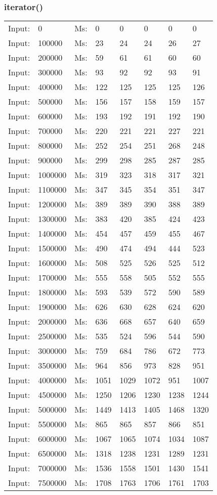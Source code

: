 \documentclass[11pt,a4paper]{report}
\begin{document}
\begin{tiny}
\subsubsection*{iterator()}
\begin{tabular}{l l ||l  l  l  l  l  l}
Input:&0&Ms:&0&0&0&0&0\\
Input:&100000&Ms:&23&24&24&26&27\\
Input:&200000&Ms:&59&61&61&60&60\\
Input:&300000&Ms:&93&92&92&93&91\\
Input:&400000&Ms:&122&125&125&125&126\\
Input:&500000&Ms:&156&157&158&159&157\\
Input:&600000&Ms:&193&192&191&192&190\\
Input:&700000&Ms:&220&221&221&227&221\\
Input:&800000&Ms:&252&254&251&268&248\\
Input:&900000&Ms:&299&298&285&287&285\\
Input:&1000000&Ms:&319&323&318&317&321\\
Input:&1100000&Ms:&347&345&354&351&347\\
Input:&1200000&Ms:&389&389&390&388&389\\
Input:&1300000&Ms:&383&420&385&424&423\\
Input:&1400000&Ms:&454&457&459&455&467\\
Input:&1500000&Ms:&490&474&494&444&523\\
Input:&1600000&Ms:&508&525&526&525&512\\
Input:&1700000&Ms:&555&558&505&552&555\\
Input:&1800000&Ms:&593&539&572&590&589\\
Input:&1900000&Ms:&626&630&628&624&620\\
Input:&2000000&Ms:&636&668&657&640&659\\
Input:&2500000&Ms:&535&524&596&544&590\\
Input:&3000000&Ms:&759&684&786&672&773\\
Input:&3500000&Ms:&964&856&973&828&951\\
Input:&4000000&Ms:&1051&1029&1072&951&1007\\
Input:&4500000&Ms:&1250&1206&1230&1238&1244\\
Input:&5000000&Ms:&1449&1413&1405&1468&1320\\
Input:&5500000&Ms:&865&865&857&866&851\\
Input:&6000000&Ms:&1067&1065&1074&1034&1087\\
Input:&6500000&Ms:&1318&1238&1231&1289&1231\\
Input:&7000000&Ms:&1536&1558&1501&1430&1541\\
Input:&7500000&Ms:&1708&1763&1706&1761&1703
\end{tabular}
\end{tiny}
\end{document}
